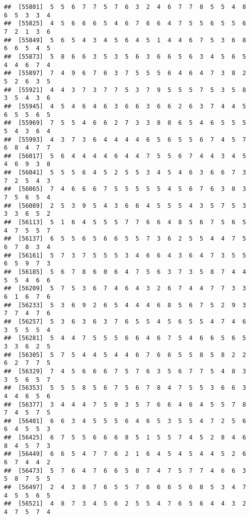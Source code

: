 \documentclass[
]{book}
\begin{document}
\begin{verbatim}
##  [55801]  5  5  6  7  7  5  7  6  3  2  4  6  7  7  8  5  5  4  8  6  5  3  3  4
##  [55825]  4  5  6  6  6  5  4  6  7  6  6  4  7  5  5  6  5  5  6  7  2  1  3  6
##  [55849]  5  6  5  4  3  4  5  6  4  5  1  4  4  6  7  5  3  6  8  6  6  5  4  5
##  [55873]  5  8  6  6  3  5  3  5  6  3  6  6  5  6  3  4  5  6  5  4  4  6  7  4
##  [55897]  7  4  9  6  7  6  3  7  5  5  5  6  4  6  4  7  3  8  2  5  2  6  3  5
##  [55921]  4  4  3  7  3  7  7  5  3  7  9  5  5  5  7  5  3  5  8  3  5  4  3  6
##  [55945]  4  5  4  6  4  6  3  6  6  3  6  6  2  6  3  7  4  4  5  6  5  5  6  5
##  [55969]  7  5  5  4  6  6  2  7  3  3  8  8  6  5  4  6  5  5  5  5  4  3  6  4
##  [55993]  4  3  7  3  6  4  4  4  4  6  5  6  5  5  6  7  4  5  7  6  8  4  7  7
##  [56017]  5  6  4  4  4  4  6  4  4  7  5  5  6  7  4  4  3  4  5  4  6  9  3  8
##  [56041]  5  5  5  6  4  5  2  5  5  3  4  5  4  6  3  6  6  7  3  7  2  5  4  3
##  [56065]  7  4  6  6  6  7  5  5  5  5  5  4  5  6  7  6  3  0  3  7  5  6  5  4
##  [56089]  2  5  3  9  5  4  3  6  6  4  5  5  5  4  3  5  7  5  3  3  3  6  5  2
##  [56113]  5  1  6  4  5  5  5  7  7  6  6  4  8  5  6  7  5  6  5  4  7  5  5  7
##  [56137]  6  5  5  6  5  6  6  5  5  7  3  6  2  5  5  4  4  7  5  6  7  8  3  4
##  [56161]  5  7  3  7  5  5  5  3  4  6  6  4  3  6  4  7  3  5  5  6  5  9  7  3
##  [56185]  5  6  7  8  6  0  6  4  7  5  6  3  7  3  5  8  7  4  4  5  5  4  6  6
##  [56209]  5  7  5  3  6  7  4  6  4  3  2  6  7  4  4  7  7  3  3  6  1  6  7  6
##  [56233]  5  3  6  9  2  6  5  4  4  4  6  8  5  6  7  5  2  9  3  7  7  4  7  6
##  [56257]  5  3  6  3  6  3  7  6  5  5  4  5  6  5  5  4  7  4  6  3  5  5  5  4
##  [56281]  5  4  4  7  5  5  5  6  6  4  6  7  5  4  6  6  5  6  5  3  3  6  2  5
##  [56305]  5  7  5  4  4  5  4  4  6  7  6  6  5  5  8  5  8  2  2  6  2  7  7  5
##  [56329]  7  4  5  6  6  6  7  5  7  6  3  5  6  7  7  5  4  8  3  3  5  6  5  7
##  [56353]  5  5  5  8  5  6  7  5  6  7  8  4  7  5  5  3  6  6  3  4  4  6  5  6
##  [56377]  3  4  4  4  7  5  9  3  5  7  6  6  4  6  4  5  5  7  8  7  4  5  7  5
##  [56401]  6  6  3  4  5  5  5  6  4  6  5  3  5  5  4  7  2  5  6  6  4  5  5  3
##  [56425]  6  7  5  5  6  6  6  8  5  1  5  5  7  4  5  2  8  4  6  8  4  5  7  3
##  [56449]  6  6  5  4  7  7  6  2  1  6  4  5  4  5  4  4  5  2  6  6  7  4  4  2
##  [56473]  5  7  6  4  7  6  6  5  8  7  4  7  5  7  7  4  6  6  3  5  8  7  5  5
##  [56497]  2  4  3  8  7  6  5  5  7  6  6  6  5  6  8  5  3  4  7  4  5  5  6  5
##  [56521]  4  8  7  3  4  5  6  2  5  5  4  7  6  5  6  4  4  3  2  4  7  5  7  4

\end{verbatim}
\end{document}
